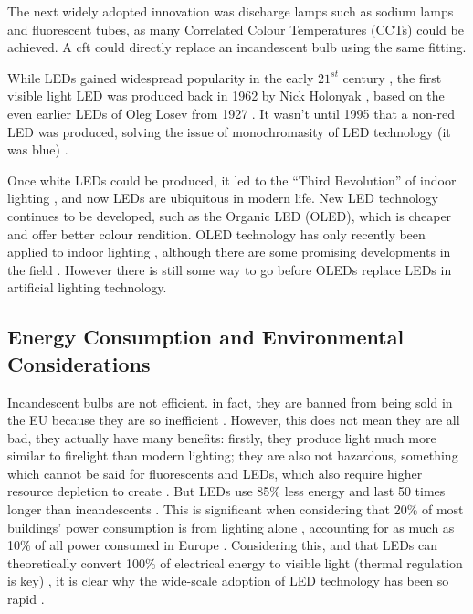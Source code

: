 The next widely adopted innovation was discharge lamps such as sodium lamps and fluorescent tubes, as many Correlated Colour Temperatures (CCTs) could be achieved. A \acrfull{cft} could directly replace an incandescent bulb using the same fitting.

While LEDs gained widespread popularity in the early $21^{st}$ century \citep{matsumotoMeasuringHouseholdAbility2020}, the first visible light LED was produced back in 1962 by Nick Holonyak \citep{holonyakCOHERENTVISIBLELIGHT1962}, based on the even earlier LEDs of Oleg Losev from 1927 \citep{zheludevLifeTimesLED2007}. It wasn't until 1995 that a non-red LED was produced, solving the issue of monochromasity of LED technology (it was blue) \citep{nakamuraInGaNAlGaNBlue1995}.

Once white LEDs could be produced, it led to the ``Third Revolution'' of indoor lighting \citep{montoyaIndoorLightingTechniques2017}, and now LEDs are ubiquitous in modern life. New LED technology continues to be developed, such as the Organic LED (OLED), which is cheaper and offer better colour rendition. OLED technology has only recently been applied to indoor lighting \citep{phelanOLEDLightingHits2018}, although there are some promising developments in the field \citep{benderSolidStateLightingConcise2015}. However there is still some way to go before OLEDs replace LEDs in artificial lighting technology.

\subsection{Energy Consumption and Environmental Considerations}
\label{sec:Energy}

Incandescent bulbs are not efficient. in fact, they are banned from being sold in the EU because they are so inefficient \citep{euDirective2012272012}. However, this does not mean they are all bad, they actually have many benefits: firstly, they produce light much more similar to firelight than modern lighting; they are also not hazardous, something which cannot be said for fluorescents and LEDs, which also require higher resource depletion to create \citep{limPotentialEnvironmentalImpacts2013}. But LEDs use 85\% less energy and last 50 times longer than incandescents \citep{mottierLEDLightingApplications2010}. This is significant when considering that 20\% of most buildings' power consumption is from lighting alone \citep{perez-lombardReviewBuildingsEnergy2008}, accounting for as much as 10\% of all power consumed in Europe \citep{bertoldiEnergyEfficiencyStatus2012}. Considering  this, and that LEDs can theoretically convert 100\% of electrical energy to visible light (thermal regulation is key) \citep{jordanChallengesLEDPackaging2012}, it is clear why the wide-scale adoption of LED technology has been so rapid \citep{matsumotoMeasuringHouseholdAbility2020}.



